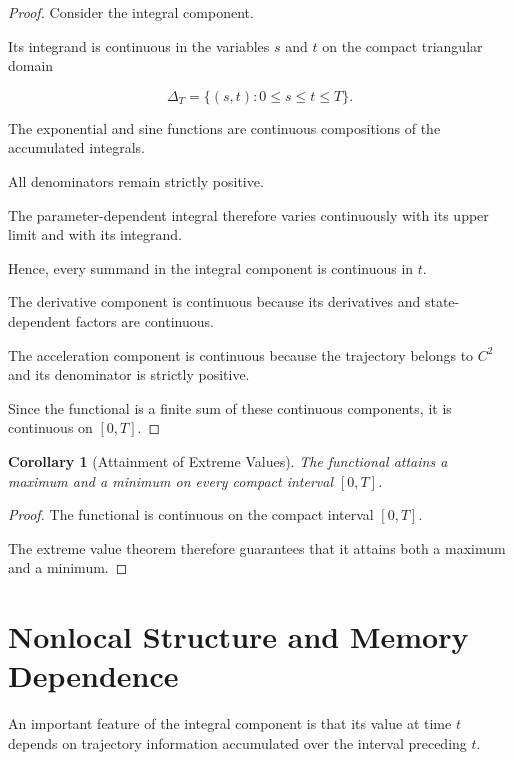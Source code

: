 \documentclass[12pt]{article}
\numberwithin{equation}{section}
\newtheorem{corollary}[theorem]{Corollary}
\theoremstyle{definition}
\theoremstyle{remark}
\begin{document}
\begin{proof}

Consider the integral component.

Its integrand is continuous in the variables
\(s\) and \(t\) on the compact triangular
domain

\[
\Delta_T
=
\{(s,t):0\leq s\leq t\leq T\}.
\]

The exponential and sine functions are
continuous compositions of the accumulated
integrals.

All denominators remain strictly positive.

The parameter-dependent integral therefore
varies continuously with its upper limit
and with its integrand.

Hence, every summand in the integral
component is continuous in \(t\).

The derivative component is continuous
because its derivatives and state-dependent
factors are continuous.

The acceleration component is continuous
because the trajectory belongs to \(C^2\)
and its denominator is strictly positive.

Since the functional is a finite sum of
these continuous components, it is
continuous on \([0,T]\).

\end{proof}

\begin{corollary}[Attainment of Extreme Values]

The functional attains a maximum and
a minimum on every compact interval
\([0,T]\).

\end{corollary}

\begin{proof}

The functional is continuous on the
compact interval \([0,T]\).

The extreme value theorem therefore
guarantees that it attains both a maximum
and a minimum.

\end{proof}


\section{Nonlocal Structure and Memory Dependence}

An important feature of the integral
component is that its value at time \(t\)
depends on trajectory information accumulated
over the interval preceding \(t\).
\end{document}
